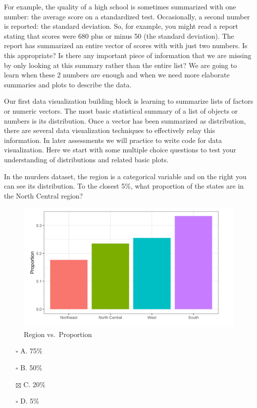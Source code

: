 \documentclass[
]{article}
\providecommand{\tightlist}{%
  \setlength{\itemsep}{0pt}\setlength{\parskip}{0pt}}
\begin{document}
For example, the quality of a high school is sometimes summarized with
one number: the average score on a standardized test. Occasionally, a
second number is reported: the standard deviation. So, for example, you
might read a report stating that scores were 680 plus or minus 50 (the
standard deviation). The report has summarized an entire vector of
scores with with just two numbers. Is this appropriate? Is there any
important piece of information that we are missing by only looking at
this summary rather than the entire list? We are going to learn when
these 2 numbers are enough and when we need more elaborate summaries and
plots to describe the data.

Our first data visualization building block is learning to summarize
lists of factors or numeric vectors. The most basic statistical summary
of a list of objects or numbers is its distribution. Once a vector has
been summarized as distribution, there are several data visualization
techniques to effectively relay this information. In later assessments
we will practice to write code for data visualization. Here we start
with some multiple choice questions to test your understanding of
distributions and related basic plots.

In the murders dataset, the region is a categorical variable and on the
right you can see its distribution. To the closest 5\%, what proportion
of the states are in the North Central region?

\begin{figure}
\centering
\includegraphics{images/Region vs Proportion.png}
\caption{Region vs.~Proportion}
\end{figure}

\begin{itemize}
\tightlist
\item[$\square$]
  A. 75\%
\item[$\square$]
  B. 50\%
\item[$\boxtimes$]
  C. 20\%
\item[$\square$]
  D. 5\%
\end{itemize}
\end{document}
